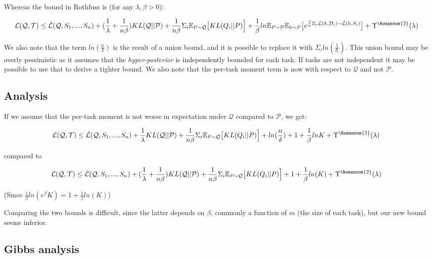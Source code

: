 \documentclass[letterpaper]{article}
\theoremstyle{definition}
\begin{document}
Whereas the bound in Rothfuss is (for any $\lambda,\beta>0$):

$$\mathcal{L}(\mathcal{Q}, \mathcal{T}) \leq \hat{\mathcal{L}}(\mathcal{Q}, S_1,...,S_n) + (\frac{1}{\lambda}+\frac{1}{n\beta}) KL(\mathcal{Q}||\mathcal{P}) + \frac{1}{n\beta}\Sigma_i \mathbb{E}_{P\sim \mathcal{Q}} \bigl [KL(Q_i||P) \Bigr ] + \frac{1}{\beta}ln\mathbb{E}_{P\sim \mathcal{P}}\mathbb{E}_{h\sim P}\bigl [ e^{\frac{\beta}{n}\Sigma_i\mathcal{L}(h,\mathcal{D}_i)- \hat{\mathcal{L}}(h, S_i)} \bigr ] +\Upsilon^{\text{\Romannum{2}}}(\lambda)$$

We also note that the term $ln(\frac{n}{\delta})$ is the result of a union bound, and it is possible to replace it with $\Sigma_i ln(\frac{1}{\delta_i})$. This union bound may be overly pessimistic as it assumes that the \emph{hyper-posterior} is independently bounded for each task. If tasks are not independent it may be possible to use that to derive a tighter bound. We also note that the per-task moment term is now with respect to $\mathcal{Q}$ and not $\mathcal{P}$. 

\subsection{Analysis}

If we assume that the per-task moment is not worse in expectation under $\mathcal{Q}$ compared to $\mathcal{P}$, we get: 

$$\mathcal{L}(\mathcal{Q}, \mathcal{T}) \leq \hat{\mathcal{L}}(\mathcal{Q}, S_1,...,S_n) + \frac{1}{\lambda} KL(\mathcal{Q}||\mathcal{P}) + \frac{1}{n\beta}\Sigma_i \mathbb{E}_{P\sim \mathcal{Q}} \bigl [KL(Q_i||P) \Bigr ] + ln(\frac{n}{\delta})+ 1+\frac{1}{\beta}ln K +\Upsilon^{\text{\Romannum{2}}}(\lambda)$$

compared to 

$$\mathcal{L}(\mathcal{Q}, \mathcal{T}) \leq \hat{\mathcal{L}}(\mathcal{Q}, S_1,...,S_n) + (\frac{1}{\lambda}+\frac{1}{n\beta}) KL(\mathcal{Q}||\mathcal{P}) + \frac{1}{n\beta}\Sigma_i \mathbb{E}_{P\sim \mathcal{Q}} \bigl [KL(Q_i||P) \Bigr ] + 1+\frac{1}{\beta}ln(K) +\Upsilon^{\text{\Romannum{2}}}(\lambda)$$

(Since $\frac{1}{\beta}ln(e^{\beta}K)=1+\frac{1}{\beta}ln(K)$)

Comparing the two bounds is difficult, since the latter depends on $\beta$, commonly a function of $m$ (the size of each task), but our new bound seems inferior.

\subsection{Gibbs analysis}
\end{document}
